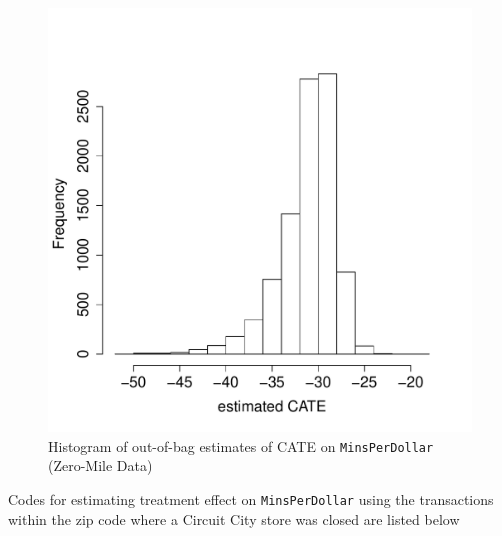 \documentclass{article}
\begin{document}
\begin{figure}[h]
\centering
\includegraphics[width=0.5\linewidth]{figures/tauhat5_ama_hist.pdf}\caption{Histogram of out-of-bag estimates of CATE  on \texttt{MinsPerDollar} (Zero-Mile Data)}\label{fig:tauhat5_ama_hist}
\end{figure}

Codes for estimating treatment effect on \texttt{MinsPerDollar} using the transactions within the zip code where a Circuit City store was closed are listed below



\newpage


% 
\end{document}
